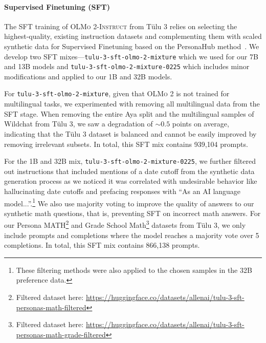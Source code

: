 \documentclass[table]{ai2style/ai2}
\newcommand{\tulu}{T\"ulu 3\xspace}
\newcommand{\olmotoo}{\textsc{OLMo 2}\xspace}
\newcommand{\olmotooinstruct}{\textsc{OLMo 2-Instruct}\xspace}
\begin{document}
\paragraph{Supervised Finetuning (SFT)} The SFT training of \olmotooinstruct from \tulu relies on selecting the highest-quality, existing instruction datasets and complementing them with scaled synthetic data for Supervised Finetuning based on the PersonaHub method~\citep{chan2024scaling}.
We develop two SFT mixes---\texttt{tulu-3-sft-olmo-2-mixture} which we used for our 7B and 13B models and \texttt{tulu-3-sft-olmo-2-mixture-0225} which includes minor modifications and applied to our 1B and 32B models.

For \texttt{tulu-3-sft-olmo-2-mixture}, given that \olmotoo is not trained for multilingual tasks, we experimented with removing all multilingual data from the SFT stage.
When removing the entire Aya split and the multilingual samples of Wildchat from \tulu, we saw a degradation of $\sim 0.5$ points on average, indicating that the \tulu dataset is balanced and cannot be easily improved by removing irrelevant subsets.
In total, this SFT mix contains 939,104 prompts.

For the 1B and 32B mix, \texttt{tulu-3-sft-olmo-2-mixture-0225}, we further filtered out instructions that included mentions of a date cutoff from the synthetic data generation process as we noticed it was correlated with undesirable behavior like hallucinating date cutoffs and prefacing responses with ``As an AI language model...''.\footnote{These filtering methods were also applied to the chosen samples in the 32B preference data.} 
We also use majority voting to improve the quality of answers to our synthetic math questions, that is, preventing SFT on incorrect math answers. 
For our Persona MATH\footnote{Filtered dataset here: \url{https://huggingface.co/datasets/allenai/tulu-3-sft-personas-math-filtered}} and Grade School Math\footnote{Filtered dataset here: \url{https://huggingface.co/datasets/allenai/tulu-3-sft-personas-math-grade-filtered}} datasets from Tülu 3, we only include prompts and completions where the model reaches a majority vote over 5 completions.
In total, this SFT mix contains 866,138 prompts.
\end{document}

